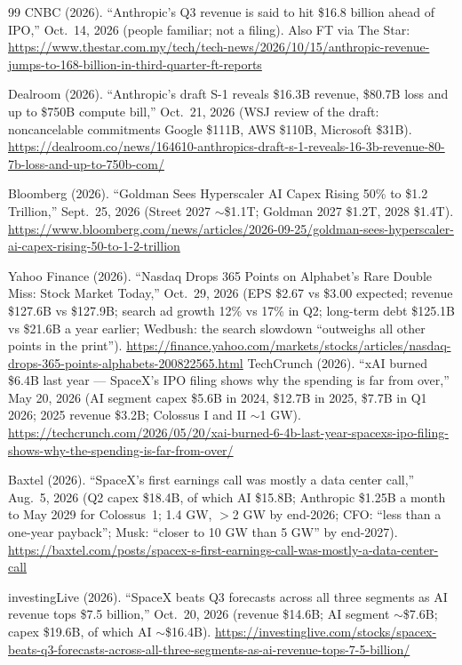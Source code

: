\documentclass[11pt,letterpaper]{article}
\begin{document}
\begin{thebibliography}{99}
CNBC (2026). ``Anthropic's Q3 revenue is said to hit \$16.8 billion ahead of IPO,'' Oct.~14, 2026 (people familiar; not a filing). Also FT via The Star: \url{https://www.thestar.com.my/tech/tech-news/2026/10/15/anthropic-revenue-jumps-to-168-billion-in-third-quarter-ft-reports}

Dealroom (2026). ``Anthropic's draft S-1 reveals \$16.3B revenue, \$80.7B loss and up to \$750B compute bill,'' Oct.~21, 2026 (WSJ review of the draft: noncancelable commitments Google \$111B, AWS \$110B, Microsoft \$31B). \url{https://dealroom.co/news/164610-anthropics-draft-s-1-reveals-16-3b-revenue-80-7b-loss-and-up-to-750b-com/}

Bloomberg (2026). ``Goldman Sees Hyperscaler AI Capex Rising 50\% to \$1.2 Trillion,'' Sept.~25, 2026 (Street 2027 $\sim$\$1.1T; Goldman 2027 \$1.2T, 2028 \$1.4T). \url{https://www.bloomberg.com/news/articles/2026-09-25/goldman-sees-hyperscaler-ai-capex-rising-50-to-1-2-trillion}


Yahoo Finance (2026). ``Nasdaq Drops 365 Points on Alphabet's Rare Double Miss: Stock Market Today,'' Oct.~29, 2026 (EPS \$2.67 vs \$3.00 expected; revenue \$127.6B vs \$127.9B; search ad growth 12\% vs 17\% in Q2; long-term debt \$125.1B vs \$21.6B a year earlier; Wedbush: the search slowdown ``outweighs all other points in the print''). \url{https://finance.yahoo.com/markets/stocks/articles/nasdaq-drops-365-points-alphabets-200822565.html}
TechCrunch (2026). ``xAI burned \$6.4B last year --- SpaceX's IPO filing shows why the spending is far from over,'' May 20, 2026 (AI segment capex \$5.6B in 2024, \$12.7B in 2025, \$7.7B in Q1 2026; 2025 revenue \$3.2B; Colossus I and II $\sim$1 GW). \url{https://techcrunch.com/2026/05/20/xai-burned-6-4b-last-year-spacexs-ipo-filing-shows-why-the-spending-is-far-from-over/}

Baxtel (2026). ``SpaceX's first earnings call was mostly a data center call,'' Aug.~5, 2026 (Q2 capex \$18.4B, of which AI \$15.8B; Anthropic \$1.25B a month to May 2029 for Colossus~1; 1.4 GW, $>$2 GW by end-2026; CFO: ``less than a one-year payback''; Musk: ``closer to 10 GW than 5 GW'' by end-2027). \url{https://baxtel.com/posts/spacex-s-first-earnings-call-was-mostly-a-data-center-call}

investingLive (2026). ``SpaceX beats Q3 forecasts across all three segments as AI revenue tops \$7.5 billion,'' Oct.~20, 2026 (revenue \$14.6B; AI segment $\sim$\$7.6B; capex \$19.6B, of which AI $\sim$\$16.4B). \url{https://investinglive.com/stocks/spacex-beats-q3-forecasts-across-all-three-segments-as-ai-revenue-tops-7-5-billion/}


\end{thebibliography}
\end{document}

